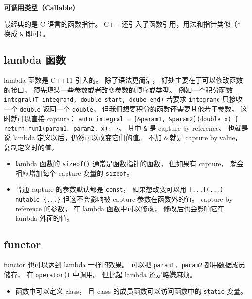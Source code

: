 

\textbf{可调用类型（Callable）}

最经典的是 C 语言的函数指针。 C++ 还引入了函数引用，用法和指针类似（\verb|*| 换成 \verb|&| 即可）。

\subsection{lambda 函数}
lambda 函数是 C++11 引入的。 除了语法更简洁， 好处主要在于可以修改函数的接口， 预先填装一些参数或者改变参数的顺序或类型。 例如一个积分函数 \verb|integral(T integrand, double start, doube end)| 若要求 \verb|integrand| 只接收一个 \verb|double| 返回一个 \verb|double|， 但我们想要积分的函数还需要其他若干参数。 这时就可以直接 capture： \verb|auto integral = [&param1, &param2](double x) { return fun1(param1, param2, x); }|。 其中 \verb|&| 是 capture by reference。 也就是说 lambda 定义以后，仍然可以改变它们的值。 不加 \verb|&| 就是 capture by value， 复制定义时的值。

\begin{itemize}
\item lambda 函数的 \verb|sizeof()| 通常是函数指针的函数， 但如果有 capture， 就会相应增加每个 capture 变量的 \verb|sizeof|。
\item 普通 capture 的参数默认都是 \verb|const|， 如果想改变可以用 \verb|[...](...) mutable {...}| 但这不会影响被 capture 参数在函数外的值。 capture by reference 的参数， 在 lambda 函数中可以修改， 修改后也会影响它在 lambda 外面的值。
\
\end{itemize}

\subsection{functor}
functor 也可以达到 lambda 一样的效果。 可以把 \verb|param1, param2| 都用数据成员储存， 在 \verb|operator()| 中调用。 但比起 lambda 还是略嫌麻烦。

\begin{itemize}
\item 函数中可以定义 class， 且 class 的成员函数可以访问函数中的 \verb|static| 变量。
\end{itemize}
